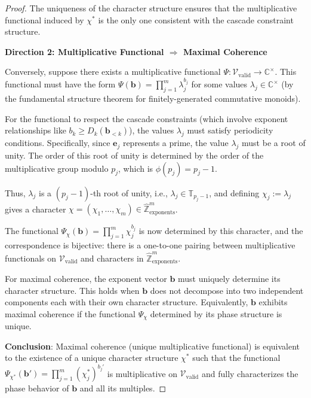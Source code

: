 \begin{proof}
The uniqueness of the character structure ensures that the multiplicative functional induced by $\chi^*$ is the only one consistent with the cascade constraint structure.

\noindent \textbf{Direction 2: Multiplicative Functional $\Rightarrow$ Maximal Coherence}

Conversely, suppose there exists a multiplicative functional $\Psi: \mathcal{V}_{\text{valid}} \to \mathbb{C}^\times$. This functional must have the form $\Psi(\mathbf{b}) = \prod_{j=1}^m \lambda_j^{b_j}$ for some values $\lambda_j \in \mathbb{C}^\times$ (by the fundamental structure theorem for finitely-generated commutative monoids).

For the functional to respect the cascade constraints (which involve exponent relationships like $b_k \geq D_k(\mathbf{b}_{<k})$), the values $\lambda_j$ must satisfy periodicity conditions. Specifically, since $\mathbf{e}_j$ represents a prime, the value $\lambda_j$ must be a root of unity. The order of this root of unity is determined by the order of the multiplicative group modulo $p_j$, which is $\phi(p_j) = p_j - 1$.

Thus, $\lambda_j$ is a $(p_j-1)$-th root of unity, i.e., $\lambda_j \in \mathbb{T}_{p_j-1}$, and defining $\chi_j := \lambda_j$ gives a character $\chi = (\chi_1, \ldots, \chi_m) \in \hat{\mathbb{Z}}^m_{\text{exponents}}$.

The functional $\Psi_\chi(\mathbf{b}) = \prod_{j=1}^m \chi_j^{b_j}$ is now determined by this character, and the correspondence is bijective: there is a one-to-one pairing between multiplicative functionals on $\mathcal{V}_{\text{valid}}$ and characters in $\hat{\mathbb{Z}}^m_{\text{exponents}}$.

For maximal coherence, the exponent vector $\mathbf{b}$ must uniquely determine its character structure. This holds when $\mathbf{b}$ does not decompose into two independent components each with their own character structure. Equivalently, $\mathbf{b}$ exhibits maximal coherence if the functional $\Psi_\chi$ determined by its phase structure is unique.

\noindent \textbf{Conclusion}: Maximal coherence (unique multiplicative functional) is equivalent to the existence of a unique character structure $\chi^*$ such that the functional $\Psi_{\chi^*}(\mathbf{b}') = \prod_{j=1}^m (\chi_j^*)^{b_j'}$ is multiplicative on $\mathcal{V}_{\text{valid}}$ and fully characterizes the phase behavior of $\mathbf{b}$ and all its multiples.

\end{proof}

